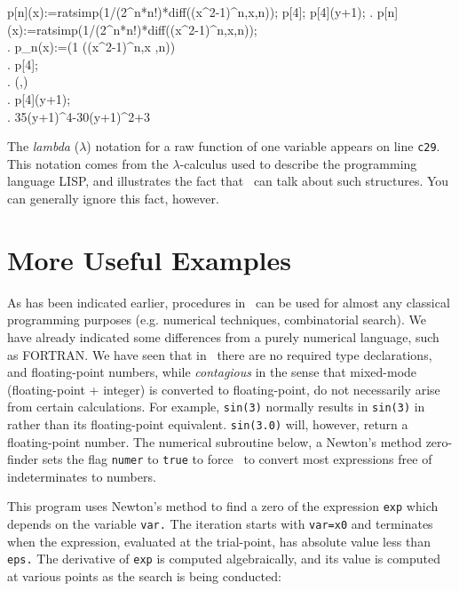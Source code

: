 \beginmaximasession
p[n](x):=ratsimp(1/(2^n*n!)*diff((x^2-1)^n,x,n));
p[4];
p[4](y+1);
\maximatexsession
{}.  p[n](x):=ratsimp(1/(2^n*n!)*diff((x^2-1)^n,x,n)); \\
.   p_{n}(x):=\left({{1}}\*
 \left(\left(x^{2}-1\right)^{n},\linebreak[0]x
 ,\linebreak[0]n\right)\right) \\
.  p[4]; \\
.   \left(\left[ x \right] ,\right) \\
.  p[4](y+1); \\
.   {{35\*\left(y+1\right)^{4}-30\*\left(y+1\right)^{2}+3}}
  \\
\endmaximasession

The {\it lambda} ($\lambda$) notation for a raw function of one
variable appears on line {\tt c29}.  This notation comes from the 
{$\lambda$-calculus} used to describe the programming language LISP, 
and illustrates the fact that \Max\
can talk about such structures. You can generally ignore this fact, however.

\section{More Useful Examples}

As has been indicated earlier, procedures in \Max\ can be used for almost any 
classical programming purposes (e.g. numerical techniques, combinatorial 
search).
We have already indicated some differences from a purely numerical
language, such as FORTRAN.  We have seen that in \Max\ there are no required
type declarations, and floating-point numbers, while {\it contagious}
in the sense that mixed-mode (floating-point + integer) is converted
to floating-point, do not
necessarily arise from certain calculations.  For example,
{\tt sin(3)} normally results in {\tt sin(3)} in \Max\,
rather than its floating-point equivalent.
{\tt sin(3.0)} will, however, return a floating-point number.
The numerical subroutine below, a Newton's method zero-finder
sets the flag {\tt numer} to {\tt true} to force \Max\
to convert most expressions free of indeterminates to numbers.  

This program uses Newton's method to find a zero of the expression {\tt exp}
which depends on the variable {\tt var.} The iteration starts with {\tt var=x0}
and terminates when the expression, evaluated at the trial-point,
has absolute value less than {\tt eps.} The derivative of {\tt exp}
is computed algebraically, and its value is computed at various
points as the search is being conducted:


